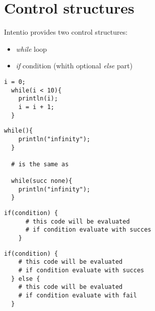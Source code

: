 \chapter{Control structures}

Intentio provides two control structures:
\begin{itemize}
  \item \emph{while} loop
  \item \emph{if} condition (whith optional \emph{else} part)
\end{itemize}

\begin{example}
\begin{lstlisting}[language=intentio]
  i = 0;
  while(i < 10){
    println(i);
    i = i + 1;
  }
\end{lstlisting}
\end{example}

\begin{example}
\begin{lstlisting}[language=intentio]
  while(){
    println("infinity");
  }

  # is the same as

  while(succ none){
    println("infinity");
  }
\end{lstlisting}
\end{example}

\clearpage
\begin{example}[If condition]
\begin{lstlisting}[language=intentio,mathescape=true]
    if(condition) {
      # this code will be evaluated
      # if condition evaluate with succes
    }
\end{lstlisting}
\end{example}

\begin{example}
\begin{lstlisting}[language=intentio,mathescape=true]
  if(condition) {
    # this code will be evaluated
    # if condition evaluate with succes
  } else {
    # this code will be evaluated
    # if condition evaluate with fail
  }
\end{lstlisting}
\end{example}
